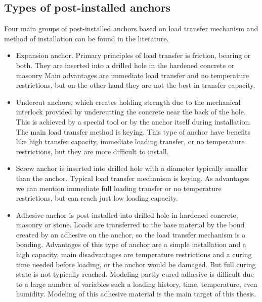 \subsection{Types of post-installed anchors}
Four main groups of post-installed anchors based on load transfer mechanism and method of installation can be found in the literature. 
\begin{itemize}
	


\item Expansion anchor. Primary principles of load transfer is friction, bearing or both. They are inserted into a drilled hole in the hardened concrete or masonry Main advantages are immediate load transfer and no temperature restrictions, but on the other hand they are not the best in transfer capacity. 

\item Undercut anchors, which creates holding strength due to the mechanical interlock provided by undercutting the concrete near the back of the hole. This is achieved by a special tool or by the anchor itself during installation. The main load transfer method is keying. This type of anchor have benefits like high transfer capacity, immediate loading transfer, or no temperature restrictions, but they are more difficult to install. 

\item Screw anchor is inserted into drilled hole with a diameter typically smaller than the anchor. Typical load transfer mechanism is keying. As advantages we can mention immediate full loading transfer or no temperature restrictions, but can reach just low loading capacity.

\item Adhesive anchor is post-installed into drilled hole in hardened concrete, masonry or stone. Loads are transferred to the base material by the bond created by an adhesive on the anchor, so the load transfer mechanism is a bonding. Advantages of this type of anchor are a simple installation and a high capacity, main disadvantages are temperature restrictions and a curing time needed before loading, or the anchor would be damaged. But full curing state is not typically reached. Modeling partly cured adhesive is difficult due to a large number of variables such a loading history, time, temperature, even humidity. Modeling of this adhesive material is the main target of this thesis.
\end{itemize} 

